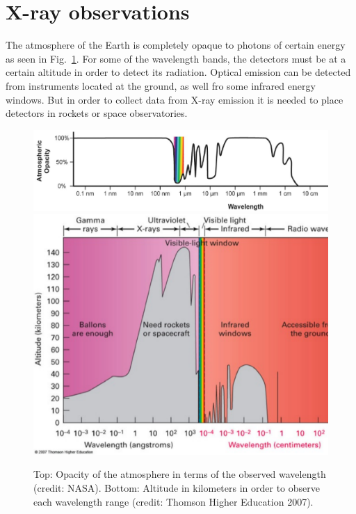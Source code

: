 \section{X-ray observations}
\label{sec2:xr}

The atmosphere of the Earth is completely opaque to photons of certain energy as seen in Fig.~\ref{sec2:atm}. For some of the wavelength bands, the detectors must be at a certain altitude in order to detect its radiation. Optical emission can be detected from instruments located at the ground, as well fro some infrared energy windows. But in order to collect data from X-ray emission it is needed to place detectors in rockets or space observatories. 

 \begin{figure}
 \centering
 \includegraphics[width=\textwidth]{Chapter2_data/opac.ps}
 \includegraphics[width=\textwidth]{Chapter2_data/trans.ps}
    \caption{Top: Opacity of the atmosphere in terms of the observed wavelength (credit: NASA). Bottom: Altitude in kilometers in order to observe each wavelength range (credit: Thomson Higher Education 2007). }
 \label{sec2:atm}
 \end{figure}
 
